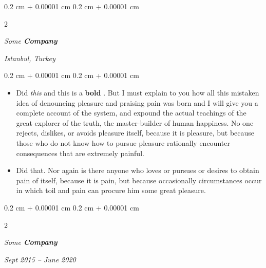 \documentclass[10pt, letterpaper]{article}
\newenvironment{highlights}{
    \begin{itemize}[
        topsep=0.10 cm,
        parsep=0.10 cm,
        partopsep=0pt,
        itemsep=0pt,
        leftmargin=0.4 cm + 10pt
    ]
}{
    \end{itemize}
} %
\newenvironment{onecolentry}{
    \begin{adjustwidth}{
        0.2 cm + 0.00001 cm
    }{
        0.2 cm + 0.00001 cm
    }
}{
    \end{adjustwidth}
} %
\newenvironment{twocolentry}[2][]{
    \onecolentry
    \def\secondColumn{#2}
    \setcolumnwidth{\fill, 4.5 cm}
    \begin{paracol}{2}
}{
    \switchcolumn \raggedleft \secondColumn
    \end{paracol}
    \endonecolentry
} %
\let\hrefWithoutArrow\href
\renewcommand{\href}[2]{\hrefWithoutArrow{#1}{\ifthenelse{\equal{#2}{}}{ }{#2 }\raisebox{.15ex}{\footnotesize \faExternalLink*}}}
\begin{document}
        \vspace{0.2 cm}

            \begin{twocolentry}{
        \textit{Istanbul, Turkey}

            }
                \textbf{}

                \textit{Some \textbf{Company}}
            \end{twocolentry}

        \vspace{0.10 cm}
        \begin{onecolentry}
            \begin{highlights}
                \item Did \textit{this} and this is a \textbf{bold} \href{https://example.com}{link}. But I must explain to you how all this mistaken idea of denouncing pleasure and praising pain was born and I will give you a complete account of the system, and expound the actual teachings of the great explorer of the truth, the master-builder of human happiness. No one rejects, dislikes, or avoids pleasure itself, because it is pleasure, but because those who do not know how to pursue pleasure rationally encounter consequences that are extremely painful.
                \item Did that. Nor again is there anyone who loves or pursues or desires to obtain pain of itself, because it is pain, but because occasionally circumstances occur in which toil and pain can procure him some great pleasure.
            \end{highlights}
        \end{onecolentry}


        \vspace{0.2 cm}

            \begin{twocolentry}{


        \textit{Sept 2015 – June 2020}    }
                \textbf{}

                \textit{Some \textbf{Company}}
            \end{twocolentry}
\end{document}
